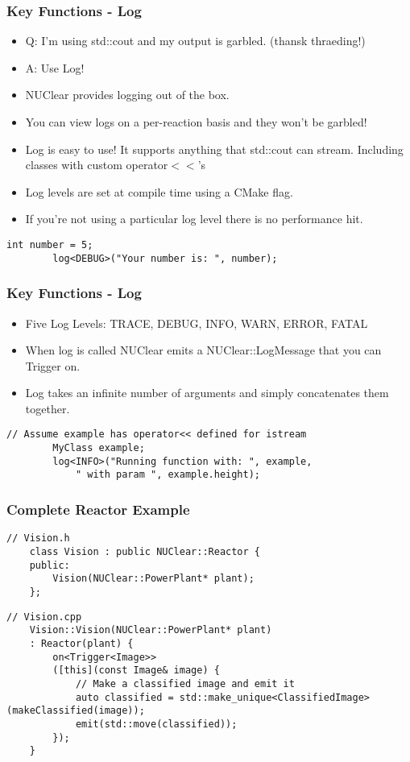 \documentclass{beamer}
\begin{document}
\begin{frame}[fragile]
	\frametitle{Key Functions - Log}
	\begin{itemize}
		\item Q: I'm using std::cout and my output is garbled. (thansk thraeding!)
		\item A: Use Log!
		\item NUClear provides logging out of the box.
		\item You can view logs on a per-reaction basis and they won't be garbled!
		\item Log is easy to use! It supports anything that std::cout can stream.
			Including classes with custom operator$<<$'s
		\item Log levels are set at compile time using a CMake flag.
		\item If you're not using a particular log level there is no performance hit.
	\end{itemize}

	\begin{lstlisting}[language=nuclear]
		int number = 5;
		log<DEBUG>("Your number is: ", number); 
	\end{lstlisting}
\end{frame}

\begin{frame}[fragile]
	\frametitle{Key Functions - Log}
	\begin{itemize}
		\item Five Log Levels: TRACE, DEBUG, INFO, WARN, ERROR, FATAL
		\item When log is called NUClear emits a NUClear::LogMessage that you can Trigger on.
		\item Log takes an infinite number of arguments and simply concatenates them together.
	\end{itemize}

	\begin{lstlisting}[language=nuclear]
		// Assume example has operator<< defined for istream
		MyClass example;
		log<INFO>("Running function with: ", example, 
		    " with param ", example.height);
	\end{lstlisting}
\end{frame}

\begin{frame}[fragile]
	\frametitle{Complete Reactor Example}
		
	\begin{lstlisting}[language=nuclear]
	// Vision.h
	class Vision : public NUClear::Reactor {
	public:
	    Vision(NUClear::PowerPlant* plant);
	};
	\end{lstlisting}
	
	\begin{lstlisting}[language=nuclear]
	// Vision.cpp
	Vision::Vision(NUClear::PowerPlant* plant)
	: Reactor(plant) {        
	    on<Trigger<Image>>
	    ([this](const Image& image) {
	        // Make a classified image and emit it
	        auto classified = std::make_unique<ClassifiedImage>(makeClassified(image));
	        emit(std::move(classified));
	    });
	}
	\end{lstlisting}
\end{frame}
\end{document}
